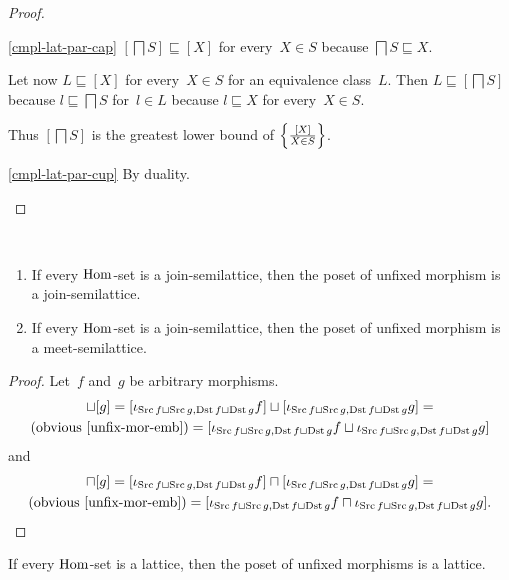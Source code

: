 \begin{proof}
~
\begin{widedisorder}
\item[\ref{cmpl-lat-par-cap}]
$[\bigsqcap S]\sqsubseteq[X]$ for every~$X\in S$ because
$\bigsqcap S\sqsubseteq X$.

Let now $L\sqsubseteq[X]$ for every~$X\in S$ for an
equivalence class~$L$. Then $L\sqsubseteq[\bigsqcap S]$
because $l\sqsubseteq\bigsqcap S$ for~$l\in L$ because
$l\sqsubseteq X$ for every~$X\in S$.

Thus $[\bigsqcap S]$ is the greatest lower bound of
$\left\{ \frac{[X]}{X\in S}\right\}$.

\item[\ref{cmpl-lat-par-cup}] By duality.
\end{widedisorder}
\end{proof}

\begin{prop}
~
\begin{enumerate}
\item If every $\operatorname{Hom}$-set is a join-semilattice, then
the poset of unfixed morphism is a join-semilattice.
\item If every $\operatorname{Hom}$-set is a join-semilattice, then
the poset of unfixed morphism is a meet-semilattice.
\end{enumerate}
\end{prop}

\begin{proof}
Let~$f$ and~$g$ be arbitrary morphisms.
\begin{multline*}
[f]\sqcup[g] =
[\iota_{\Src f\sqcup\Src g,\Dst f\sqcup\Dst g}f]\sqcup
[\iota_{\Src f\sqcup\Src g,\Dst f\sqcup\Dst g}g] = \\
\text{(obvious~\ref{unfix-mor-emb})} =
[\iota_{\Src f\sqcup\Src g,\Dst f\sqcup\Dst g}f\sqcup
\iota_{\Src f\sqcup\Src g,\Dst f\sqcup\Dst g}g]
\end{multline*}
and
\begin{multline*}
[f]\sqcap[g] =
[\iota_{\Src f\sqcup\Src g,\Dst f\sqcup\Dst g}f]\sqcap
[\iota_{\Src f\sqcup\Src g,\Dst f\sqcup\Dst g}g] = \\
\text{(obvious~\ref{unfix-mor-emb})} =
[\iota_{\Src f\sqcup\Src g,\Dst f\sqcup\Dst g}f\sqcap
\iota_{\Src f\sqcup\Src g,\Dst f\sqcup\Dst g}g].
\end{multline*}
\end{proof}

\begin{cor}
If every $\operatorname{Hom}$-set is a lattice, then
the poset of unfixed morphisms is a lattice.
\end{cor}

